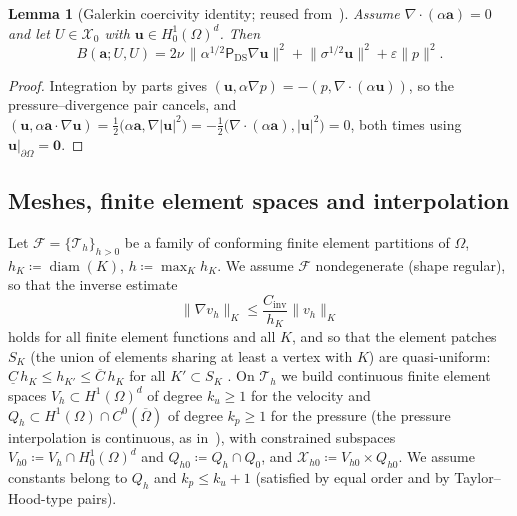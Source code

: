 \documentclass[11pt]{article}
\newtheorem{lemma}[theorem]{Lemma}
\theoremstyle{remark}
\newcommand{\bu}{\boldsymbol{u}}
\newcommand{\ba}{\boldsymbol{a}}
\newcommand{\ViscProj}{\mathsf{P}_{\mathrm{DS}}}
\newcommand{\norm}[1]{\lVert #1 \rVert}
\newcommand{\Xhz}{\mathcal{X}_{h0}}
\begin{document}
\begin{lemma}[Galerkin coercivity identity; reused from~\cite{companion}]
\label{lem:coercivity}
Assume $\nabla\cdot(\alpha\ba) = 0$ and let $U \in \mathcal{X}_0$ with
$\bu \in H^1_0(\Omega)^d$. Then
\begin{equation}
  \label{eq:CoercivityIdentity}
  B(\ba; U, U)
  = 2\nu\,\bigl\lVert \alpha^{1/2}\ViscProj\nabla\bu \bigr\rVert^2
  + \bigl\lVert\sigma^{1/2}\bu\bigr\rVert^2
  + \varepsilon\bigl\lVert p\bigr\rVert^2 .
\end{equation}
\end{lemma}

\begin{proof}
Integration by parts gives $(\bu, \alpha\nabla p) = -(p, \nabla\cdot(\alpha\bu))$, so
the pressure--divergence pair cancels, and
$(\bu, \alpha\ba\cdot\nabla\bu) = \tfrac12\bigl(\alpha\ba, \nabla|\bu|^2\bigr)
= -\tfrac12\bigl(\nabla\cdot(\alpha\ba), |\bu|^2\bigr) = 0$, both times using
$\bu|_{\partial\Omega} = \boldsymbol{0}$.
\end{proof}

\subsection{Meshes, finite element spaces and interpolation}
\label{sec:meshes}

Let $\mathcal{F} = \{\mathcal{T}_h\}_{h>0}$ be a family of conforming finite element
partitions of $\Omega$, $h_K \coloneqq \operatorname{diam}(K)$,
$h \coloneqq \max_K h_K$. We assume $\mathcal{F}$ nondegenerate (shape regular), so
that the inverse estimate
\begin{equation}
  \label{eq:InverseEstimate}
  \norm{\nabla v_h}_{K} \le \frac{C_{\mathrm{inv}}}{h_K}\norm{v_h}_{K}
\end{equation}
holds for all finite element functions and all $K$, and so that the element patches
$S_K$ (the union of elements sharing at least a vertex with $K$) are quasi-uniform:
$\underline{C}\, h_{K} \le h_{K'} \le \overline{C}\, h_K$ for all $K' \subset S_K$
\cite{AinsworthOden}. On $\mathcal{T}_h$ we build continuous finite element spaces
$V_h \subset H^1(\Omega)^d$ of degree $k_u \ge 1$ for the velocity and
$Q_h \subset H^1(\Omega)\cap C^0(\overline\Omega)$ of degree $k_p \ge 1$ for the
pressure (the pressure interpolation is continuous, as in~\cite{companion}), with
constrained subspaces $V_{h0} \coloneqq V_h \cap H^1_0(\Omega)^d$ and
$Q_{h0} \coloneqq Q_h \cap Q_0$, and $\Xhz \coloneqq V_{h0}\times Q_{h0}$. We assume
constants belong to $Q_h$ and $k_p \le k_u + 1$ (satisfied by equal order and by
Taylor--Hood-type pairs).
\end{document}
